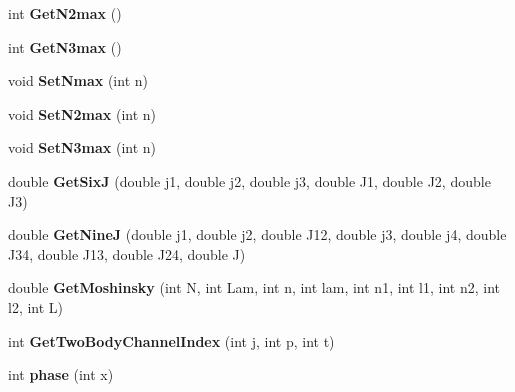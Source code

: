 \begin{DoxyCompactItemize}
\item 
\hypertarget{classModelSpace_a415e7663769bcab236a66c9914f9ff13}{int {\bfseries Get\-N2max} ()}\label{classModelSpace_a415e7663769bcab236a66c9914f9ff13}

\item 
\hypertarget{classModelSpace_a15a5f8ef44f769c052ae1ae5d475fc01}{int {\bfseries Get\-N3max} ()}\label{classModelSpace_a15a5f8ef44f769c052ae1ae5d475fc01}

\item 
\hypertarget{classModelSpace_a1a50d734edaef5cb3bd79a4707ef1e82}{void {\bfseries Set\-Nmax} (int n)}\label{classModelSpace_a1a50d734edaef5cb3bd79a4707ef1e82}

\item 
\hypertarget{classModelSpace_ab13111671fc76cf1c52b98a3f78a1dcd}{void {\bfseries Set\-N2max} (int n)}\label{classModelSpace_ab13111671fc76cf1c52b98a3f78a1dcd}

\item 
\hypertarget{classModelSpace_a432f3913aa487bf7fc7c4eb5a2197599}{void {\bfseries Set\-N3max} (int n)}\label{classModelSpace_a432f3913aa487bf7fc7c4eb5a2197599}

\item 
\hypertarget{classModelSpace_a716c2bf4a6b42c1c27579b0b7804252e}{double {\bfseries Get\-Six\-J} (double j1, double j2, double j3, double J1, double J2, double J3)}\label{classModelSpace_a716c2bf4a6b42c1c27579b0b7804252e}

\item 
\hypertarget{classModelSpace_aca2833c34ad03980b80fee851b88ec5e}{double {\bfseries Get\-Nine\-J} (double j1, double j2, double J12, double j3, double j4, double J34, double J13, double J24, double J)}\label{classModelSpace_aca2833c34ad03980b80fee851b88ec5e}

\item 
\hypertarget{classModelSpace_a85f0b95b2cd46504702ea80489455beb}{double {\bfseries Get\-Moshinsky} (int N, int Lam, int n, int lam, int n1, int l1, int n2, int l2, int L)}\label{classModelSpace_a85f0b95b2cd46504702ea80489455beb}

\item 
\hypertarget{classModelSpace_ae73e211248e6f2bd4cc1bb0f030144ce}{int {\bfseries Get\-Two\-Body\-Channel\-Index} (int j, int p, int t)}\label{classModelSpace_ae73e211248e6f2bd4cc1bb0f030144ce}

\item 
\hypertarget{classModelSpace_a6b4d1686088e3fef492df10bbd806fe2}{int {\bfseries phase} (int x)}\label{classModelSpace_a6b4d1686088e3fef492df10bbd806fe2}


\end{DoxyCompactItemize}

